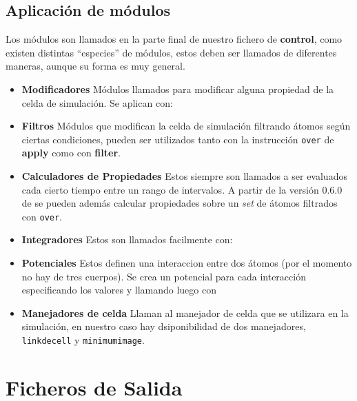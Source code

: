 \subsection{Aplicaci\'on de m\'odulos}

Los m\'odulos son llamados en la parte final de nuestro fichero de \textbf{control}, como existen distintas ``especies'' de m\'odulos, estos deben ser llamados de diferentes maneras, aunque su forma es muy general.

\begin{itemize}
 \item \textbf{Modificadores}
  M\'odulos llamados para modificar alguna propiedad de la celda de simulaci\'on. Se aplican con:
 \item \textbf{Filtros}
  M\'odulos que modifican la celda de simulaci\'on filtrando \'atomos seg\'un ciertas condiciones, pueden ser
  utilizados tanto con la instrucci\'on \verb|over| de \textbf{apply} como con \textbf{filter}.
 \item \textbf{Calculadores de Propiedades}
  Estos siempre son llamados a ser evaluados cada cierto tiempo entre un rango de intervalos. A partir de la versi\'on 0.6.0 de {\lpmd} se pueden adem\'as calcular propiedades sobre un \textit{set} de \'atomos filtrados con \verb|over|.
 \item \textbf{Integradores}
  Estos son llamados facilmente con:
 \item \textbf{Potenciales}
  Estos definen una interaccion entre dos \'atomos (por el momento no hay de tres cuerpos). Se crea un potencial para cada interacci\'on especificando los valores y llamando luego con
 \item \textbf{Manejadores de celda}
  Llaman al manejador de celda que se utilizara en la simulaci\'on, en nuestro caso hay dsiponibilidad de dos manejadores, \verb|linkdecell| y \verb|minimumimage|.
\end{itemize}

\section{Ficheros de Salida}

